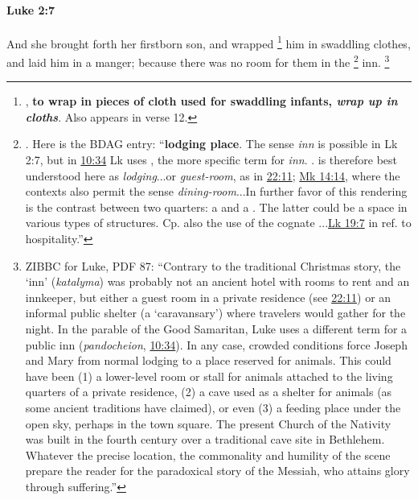 		\paragraph{Luke 2:7} %
			\label{LUKE-2-7}

			And she brought forth her firstborn son, and wrapped%
				\footnote{%
					, \textbf{to wrap in pieces of cloth used for swaddling infants, \textit{wrap up in cloths}}. Also appears in verse 12.
					}
			him in swaddling clothes, and laid him in a manger; because there was no room for them in the
				\footnote{%
					. Here is the BDAG entry: ``\textbf{lodging place}.  The sense \textit{inn} is possible in Lk 2:7, but in \hyperref[LUKE-10-34]{10:34} Lk uses , the more specific term for \textit{inn}. . is therefore best understood here as \textit{lodging}...or \textit{guest-room}, as in \hyperref[LUKE-22-11]{22:11}; \hyperref[MARK-14-14]{Mk 14:14}, where the contexts also permit the sense \textit{dining-room}...In further favor of this rendering is the contrast between two quarters: a  and a . The latter could be a space in various types of structures. Cp. also the use of the cognate ...\hyperref[LUKE-19-7]{Lk 19:7} in ref. to hospitality.''
					}%
			inn.%
				\footnote{%
					ZIBBC for Luke, PDF 87: ``Contrary to the traditional Christmas story, the `inn' (\textit{katalyma}) was probably not an ancient hotel with rooms to rent and an innkeeper, but either a guest room in a private residence (see \hyperref[LUKE-22-11]{22:11}) or an informal public shelter (a `caravansary') where travelers would gather for the night. In the parable of the Good Samaritan, Luke uses a different term for a public inn (\textit{pandocheion}, \hyperref[LUKE-10-34]{10:34}). In any case, crowded conditions force Joseph and Mary from normal lodging to a place reserved for animals. This could have been (1) a lower-level room or stall for animals attached to the living quarters of a private residence, (2) a cave used as a shelter for animals (as some ancient traditions have claimed), or even (3) a feeding place under the open sky, perhaps in the town square. The present Church of the Nativity was built in the fourth century over a traditional cave site in Bethlehem. Whatever the precise location, the commonality and humility of the scene prepare the reader for the paradoxical story of the Messiah, who attains glory through suffering.'' 
					}

